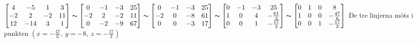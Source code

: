$\begin{bmatrix}
4 &-5 &1 &3 \\
-2&2 &-2 &11 \\
12 &-14 &3 &1
\end{bmatrix}\thicksim
\begin{bmatrix}
0 &-1 &-3 &25 \\
-2 &2 &-2 &11 \\
0 &-2 &-9 &67
\end{bmatrix}\thicksim
\begin{bmatrix}
0 &-1 &-3 &25 \\
-2 &0 &-8 &61 \\
0 &0 &-3 &17
\end{bmatrix}\thicksim
\begin{bmatrix}
0 &-1 &-3 &25 \\
1 &0 &4 &-\frac{61}{2} \\
0 &0 &1 &-\frac{17}{3}
\end{bmatrix}\thicksim
\begin{bmatrix}
0 &1 &0 &8 \\
1 &0 &0 &-\frac{47}{6}\\
0 &0 &1 &-\frac{17}{3}
\end{bmatrix}
$ De tre linjerna möts i punkten $(x=-\frac{47}{6},\ y=-8,\ z=-\frac{17}{3})$